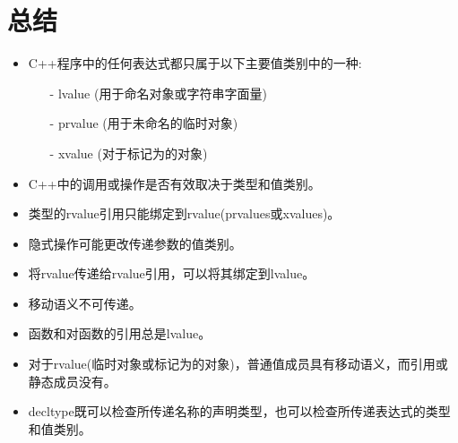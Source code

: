 \section{总结}
\begin{itemize}
	\item C++程序中的任何表达式都只属于以下主要值类别中的一种:
	\begin{itemize}
		\item[-] lvalue (用于命名对象或字符串字面量)
		\item[-] prvalue (用于未命名的临时对象)
		\item[-] xvalue (对于标记为的对象)
	\end{itemize}
	\item C++中的调用或操作是否有效取决于类型和值类别。
	\item 类型的rvalue引用只能绑定到rvalue(prvalues或xvalues)。
	\item 隐式操作可能更改传递参数的值类别。
	\item 将rvalue传递给rvalue引用，可以将其绑定到lvalue。
	\item 移动语义不可传递。
	\item 函数和对函数的引用总是lvalue。
	\item 对于rvalue(临时对象或标记为的对象)，普通值成员具有移动语义，而引用或静态成员没有。
	\item decltype既可以检查所传递名称的声明类型，也可以检查所传递表达式的类型和值类别。
\end{itemize}


